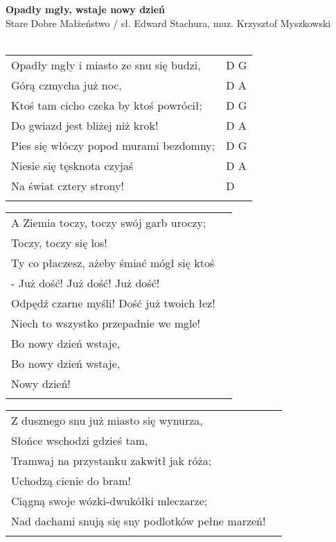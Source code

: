 \documentclass[a5paper]{article}
\begin{document}


\noindent
\fontsize{12pt}{15pt}\selectfont
\textbf{Opadły mgły, wstaje nowy dzień} \\
\fontsize{8pt}{10pt}\selectfont
Stare Dobre Małżeństwo / sł. Edward Stachura, muz. Krzysztof Myszkowski \\ \\
\fontsize{10pt}{12pt}\selectfont
{}
\begin{tabular}{@{}p{8.50cm}p{3cm}@{}}
\noindent
Opadły mgły i miasto ze snu się budzi, & D G \\
Górą czmycha już noc, & D A \\
Ktoś tam cicho czeka by ktoś powrócił; & D G \\
Do gwiazd jest bliżej niż krok! & D A\\
Pies się włóczy popod murami bezdomny; & D G \\
Niesie się tęsknota czyjaś & D A \\
Na świat cztery strony! & D \\ \\
\end{tabular} 

\noindent
\begin{tabular}{@{}p{7.50cm}p{3cm}@{}}
A Ziemia toczy, toczy swój garb uroczy; \\
Toczy, toczy się los! \\
Ty co płaczesz, ażeby śmiać mógł się ktoś \\
- Już dość! Już dość! Już dość! \\
Odpędź czarne myśli! Dość już twoich łez! \\
Niech to wszystko przepadnie we mgle! \\
Bo nowy dzień wstaje, \\
Bo nowy dzień wstaje, \\
Nowy dzień! \\ \\
\end{tabular} 

\noindent
\begin{tabular}{@{}p{7.50cm}p{3cm}@{}}
Z dusznego snu już miasto się wynurza, \\
Słońce wschodzi gdzieś tam, \\
Tramwaj na przystanku zakwitł jak róża; \\
Uchodzą cienie do bram! \\
Ciągną swoje wózki-dwukółki mleczarze;  \\
Nad dachami snują się sny podlotków pełne marzeń! \\ \\
\end{tabular} 
\end{document}
